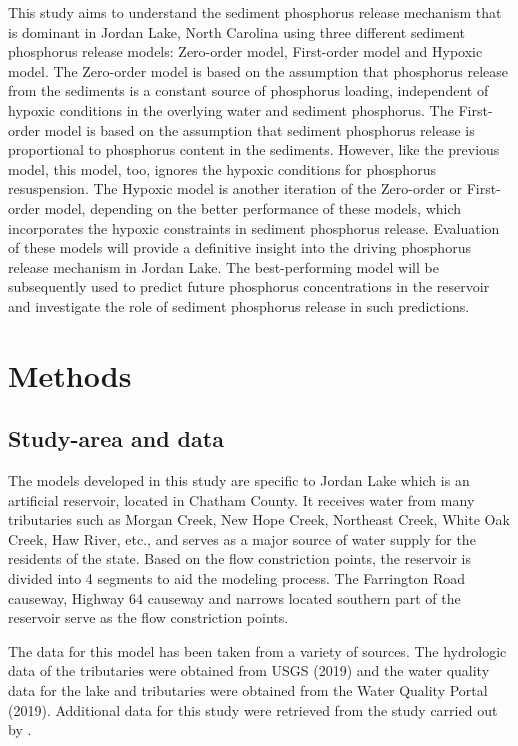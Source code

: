 \documentclass[fleqn]{article}
\begin{document}
This study aims to understand the sediment phosphorus release mechanism that is dominant in Jordan Lake, North Carolina using three different sediment phosphorus release models: Zero-order model, First-order model and Hypoxic model. The Zero-order model is based on the assumption that phosphorus release from the sediments is a constant source of phosphorus loading, independent of hypoxic conditions in the overlying water and sediment phosphorus. The First-order model is based on the assumption that sediment phosphorus release is proportional to phosphorus content in the sediments. However, like the previous model, this model, too, ignores the hypoxic conditions for phosphorus resuspension. The Hypoxic model is another iteration of the Zero-order or First-order model, depending on the better performance of these models, which incorporates the hypoxic constraints in sediment phosphorus release. Evaluation of these models will provide a definitive insight into the driving phosphorus release mechanism in Jordan Lake. The best-performing model will be subsequently used to predict future phosphorus concentrations in the reservoir and investigate the role of sediment phosphorus release in such predictions.

\section{Methods}
\subsection{Study-area and data}
The models developed in this study are specific to Jordan Lake which is an artificial reservoir, located in Chatham County. It receives water from many tributaries such as Morgan Creek, New Hope Creek, Northeast Creek, White Oak Creek, Haw River, etc., and serves as a major source of water supply for the residents of the state. Based on the flow constriction points, the reservoir is divided into 4 segments to aid the modeling process. The Farrington Road causeway, Highway 64 causeway and narrows located southern part of the reservoir serve as the flow constriction points.

The data for this model has been taken from a variety of sources. The hydrologic data of the tributaries were obtained from USGS (2019)  and the water quality data for the lake and tributaries were obtained from the Water Quality Portal (2019). Additional data for this study were retrieved from the study carried out by \parencite{DelGuidice2019}. 
\end{document}
